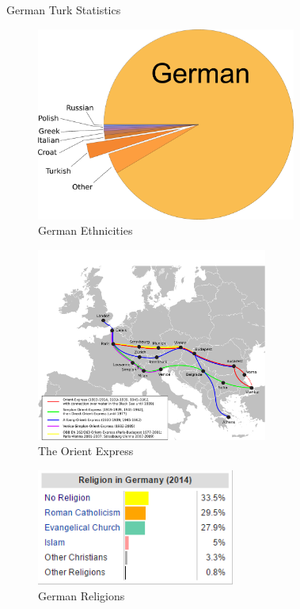 \documentclass[a4paper, 14pt]{article}
\begin{document}
\centering
{\Huge German Turk Statistics}
\begin{figure}[H]
	\centering
	\includegraphics[height=2.5in]{germanpop.pdf}
	\caption{German Ethnicities}
	\label{fig:eth}
\end{figure}

\begin{figure}[H]
	\centering
	\includegraphics[height=2.5in]{oxpress.png}
	\caption{The Orient Express}
\end{figure}

\begin{figure}[H]
	\centering
	\includegraphics[height=1.5in]{tbl.png}
	\caption{German Religions}
	\label{fig:lbl}
\end{figure}
\end{document}
